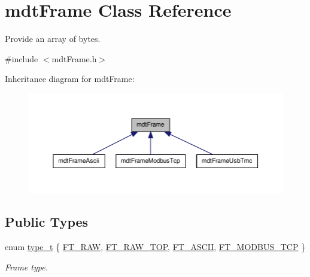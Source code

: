 \hypertarget{classmdt_frame}{
\section{mdtFrame Class Reference}
\label{classmdt_frame}
}


Provide an array of bytes.  




{\ttfamily \#include $<$mdtFrame.h$>$}



Inheritance diagram for mdtFrame:
\nopagebreak
\begin{figure}[H]
\begin{center}
\leavevmode
\includegraphics[width=400pt]{classmdt_frame__inherit__graph}
\end{center}
\end{figure}
\subsection*{Public Types}
\begin{DoxyCompactItemize}
\item 
enum \hyperlink{classmdt_frame_af936e37d5fe4c066c0fb0161fafd4a17}{type\_\-t} \{ \hyperlink{classmdt_frame_af936e37d5fe4c066c0fb0161fafd4a17aeb10e33f775c33799273fcb130fee86f}{FT\_\-RAW}, 
\hyperlink{classmdt_frame_af936e37d5fe4c066c0fb0161fafd4a17ac91a1c1827fa634eadaddb861f805c96}{FT\_\-RAW\_\-TOP}, 
\hyperlink{classmdt_frame_af936e37d5fe4c066c0fb0161fafd4a17ac649559564652abbe656b97d4a84b722}{FT\_\-ASCII}, 
\hyperlink{classmdt_frame_af936e37d5fe4c066c0fb0161fafd4a17a72c8ddaf29839f4037b686bdc346828a}{FT\_\-MODBUS\_\-TCP}
 \}
\begin{DoxyCompactList}\small\item\em Frame type. \end{DoxyCompactList}\end{DoxyCompactItemize}
